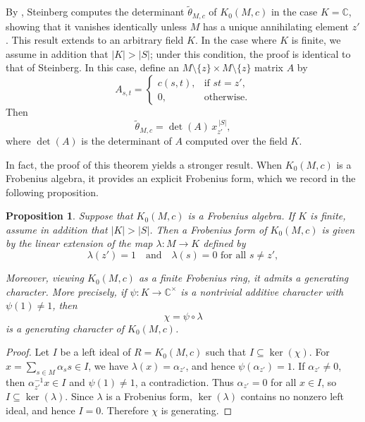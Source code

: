 \documentclass[11pt,reqno]{amsart}
\theoremstyle{plain}
\newtheorem{prop}[thm]{Proposition}
\theoremstyle{remark}
\theoremstyle{definition}
\begin{document}
By \cite[Theorem~5.2]{Ste-Fac-det}, Steinberg computes the determinant 
$\widetilde{\theta}_{M,c}$ of $K_0(M,c)$ in the case $K=\mathbb{C}$, showing 
that it vanishes identically unless $M$ has a unique annihilating element $z'$. 
This result extends to an arbitrary field $K$. In the case where $K$ is finite, 
we assume in addition that $|K| > |S|$; under this condition, the proof is identical 
to that of Steinberg.
In this case, define an $M \setminus \{z\} \times M \setminus \{z\}$ matrix $A$ by
\[
A_{s,t} =
\begin{cases}
c(s,t), & \text{if } st = z', \\
0, & \text{otherwise}.
\end{cases}
\]
Then
\[
\widetilde{\theta}_{M,c} = \det(A)\, x_{z'}^{\,|S|},
\]
where $\det(A)$ is the determinant of $A$ computed over the field $K$.

In fact, the proof of this theorem yields a stronger result. When $K_0(M,c)$ is a Frobenius algebra, it provides an explicit Frobenius form, which we record in the following proposition.

\begin{prop}\label{GenCharMc}
Suppose that $K_0(M,c)$ is a Frobenius algebra. If $K$ is finite, assume in addition that $|K| > |S|$. Then a Frobenius form of $K_0(M,c)$ is given by the linear extension of the map $\lambda : M \to K$ defined by
\[
\lambda(z') = 1 \quad \text{and} \quad \lambda(s) = 0 \text{ for all } s \neq z',
\]
   

Moreover, viewing $K_0(M,c)$ as a finite Frobenius ring, it admits a generating character. More precisely, if $\psi : K \to \mathbb{C}^\times$ is a nontrivial additive character with $\psi(1)\neq 1$, then 
\[
\chi=\psi\circ\lambda
\]
is a generating character of $K_0(M,c)$.
\end{prop}

\begin{proof}
Let $I$ be a left ideal of $R=K_0(M,c)$ such that $I \subseteq \ker(\chi)$. For $x=\sum_{s\in M}\alpha_s s \in I$, we have $\lambda(x)=\alpha_{z'}$, and hence $\psi(\alpha_{z'})=1$. If $\alpha_{z'} \neq 0$, then $\alpha_{z'}^{-1}x \in I$ and $\psi(1)\neq 1$, a contradiction. Thus $\alpha_{z'}=0$ for all $x \in I$, so $I \subseteq \ker(\lambda)$. Since $\lambda$ is a Frobenius form, $\ker(\lambda)$ contains no nonzero left ideal, and hence $I=0$. Therefore $\chi$ is generating.
\end{proof}
\end{document}
